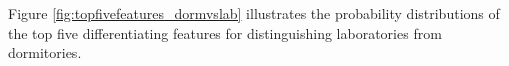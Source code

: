 Figure \ref{fig:topfivefeatures_dormvslab} illustrates the probability distributions of the top five differentiating features for distinguishing laboratories from dormitories.